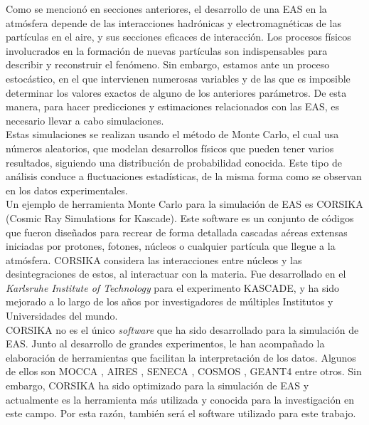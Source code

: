 Como se mencionó en secciones anteriores, el desarrollo de una EAS en la atmósfera depende de las interacciones hadrónicas y electromagnéticas de las partículas en el aire, y sus secciones eficaces de interacción. Los procesos físicos involucrados en la formación de nuevas partículas son indispensables para describir y reconstruir el fenómeno. Sin embargo, estamos ante un proceso estocástico, en el que intervienen numerosas variables y de las que es imposible determinar los valores exactos de alguno de los anteriores parámetros. De esta manera, para hacer predicciones y estimaciones relacionados con las EAS, es necesario llevar a cabo simulaciones.\\

Estas simulaciones se realizan usando el método de Monte Carlo, el cual usa números aleatorios, que modelan desarrollos físicos que pueden tener varios resultados, siguiendo una distribución de probabilidad conocida. Este tipo de análisis conduce a fluctuaciones estadísticas, de la misma forma como se observan en los datos experimentales\cite{Alania}.\\

Un ejemplo de herramienta Monte Carlo para la simulación de EAS es CORSIKA (Cosmic Ray Simulations for Kascade). Este software es un conjunto de códigos que fueron diseñados para recrear de forma detallada cascadas aéreas extensas iniciadas por protones, fotones, núcleos o cualquier partícula que llegue a la atmósfera. CORSIKA considera las interacciones entre núcleos y las desintegraciones de estos, al interactuar con la materia. Fue desarrollado en el \textit{Karlsruhe Institute of Technology} para el experimento KASCADE, \cite{Heck1998} y ha sido mejorado a lo largo de los años por investigadores de múltiples Institutos y Universidades del mundo. \\

CORSIKA no es el único \textit{software} que ha sido desarrollado para la simulación de EAS. Junto al desarrollo de grandes experimentos, le han acompañado la elaboración de herramientas que facilitan la interpretación de los datos. Algunos de ellos son MOCCA \cite{Engel2018}, AIRES \cite{Engel2018}, SENECA \cite{Engel2018}, COSMOS \cite{Engel2018}, GEANT4 \cite{Engel2018} entre otros. Sin embargo, CORSIKA ha sido optimizado para la simulación de EAS y actualmente es la herramienta más utilizada y conocida para la investigación en este campo. Por esta razón, también será el software utilizado para este trabajo.\\

